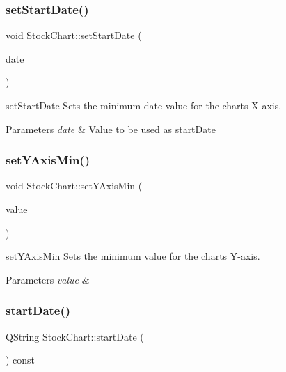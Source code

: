 \subsubsection{\texorpdfstring{set\+Start\+Date()}{setStartDate()}}
{\footnotesize\ttfamily void Stock\+Chart\+::set\+Start\+Date (\begin{DoxyParamCaption}\item[{const Q\+String \&}]{date }\end{DoxyParamCaption})}



set\+Start\+Date Sets the minimum date value for the chart\textquotesingle{}s X-\/axis. 


\begin{DoxyParams}{Parameters}
{\em date} & Value to be used as start\+Date \\
\hline
\end{DoxyParams}
\mbox{\label{class_stock_chart_a4cfeb533f5b01e029cb25831252d8f1d}} 
\subsubsection{\texorpdfstring{set\+Y\+Axis\+Min()}{setYAxisMin()}}
{\footnotesize\ttfamily void Stock\+Chart\+::set\+Y\+Axis\+Min (\begin{DoxyParamCaption}\item[{double}]{value }\end{DoxyParamCaption})}



set\+Y\+Axis\+Min Sets the minimum value for the chart\textquotesingle{}s Y-\/axis. 


\begin{DoxyParams}{Parameters}
{\em value} & \\
\hline
\end{DoxyParams}
\mbox{\label{class_stock_chart_a7b80ba09f101dd678db485f0ebe47c79}} 
\subsubsection{\texorpdfstring{start\+Date()}{startDate()}}
{\footnotesize\ttfamily Q\+String Stock\+Chart\+::start\+Date (\begin{DoxyParamCaption}{ }\end{DoxyParamCaption}) const}



